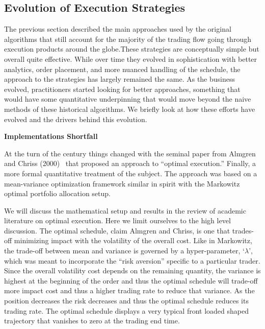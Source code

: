\subsection{Evolution of Execution Strategies}


The previous section described the main approaches used by the original algorithms that still account for the majority of the trading flow going through execution products around the globe.These strategies are conceptually simple but overall quite effective. While over time they evolved in sophistication with better analytics, order placement, and more nuanced handling of the schedule, the approach to the strategies has largely remained the same. As the business evolved, practitioners started looking for better approaches, something that would have some quantitative underpinning that would move beyond the naive methods of these historical algorithms. We briefly look at how these efforts have evolved and the drivers behind this evolution. \twomedskip


\noindent\textbf{Implementations Shortfall} \twomedskip


At the turn of the century things changed with the seminal paper from Almgren and Chriss (2000)~\cite{alm2000} that proposed an approach to ``optimal execution.'' Finally, a more formal quantitative treatment of the subject. The approach was based on a  mean-variance optimization framework similar in spirit with the Markowitz optimal portfolio allocation setup.


We will discuss the  mathematical setup and results in the review of  academic literature on optimal execution. Here we limit ourselves to the high level discussion. The optimal schedule, claim Almgren and Chriss, is one that trades-off minimizing impact with the volatility of the overall cost. Like in Markowitz, the trade-off between mean and variance is governed by a hyper-parameter, `$\lambda$', which was meant to incorporate the ``risk aversion'' specific to a particular trader. Since the overall volatility cost depends on the remaining quantity, the variance is highest at the beginning of the order and thus the optimal schedule will trade-off more impact cost and thus a higher trading rate to reduce that variance. As the position decreases the risk decreases and thus the optimal schedule reduces its trading rate. The optimal schedule displays a very typical front loaded shaped trajectory that vanishes to zero at the trading end time.


